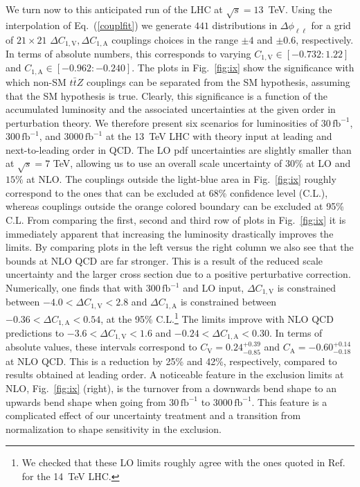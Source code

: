 \documentclass{JHEP3}
\def\ttbZ{t\bar{t}Z}
\def\invfb {\mathrm{fb}^{-1}}
\def\ConeA{C_{1,\mathrm{A}}}
\def\ConeV{C_{1,\mathrm{V}}}
\def\DConeA{\Delta C_{1,\mathrm{A}}}
\def\DConeV{\Delta C_{1,\mathrm{V}}}
\begin{document}
We turn now to this anticipated run of the LHC at $\sqrt{s}=13$~TeV.
Using the interpolation of Eq.~(\ref{couplfit}) we generate $441$ distributions in $\Delta \phi_{\ell\ell}$ for a grid of $21 \times 21$ $\DConeV,\DConeA$ couplings 
choices in the range $\pm 4$ and $\pm 0.6$, respectively. 
In terms of absolute numbers, this corresponds to varying $\ConeV \in [-0.732:1.22]$ and $\ConeA \in [-0.962:-0.240]$.
The plots in Fig.~\ref{fig:ix} show the significance with which non-SM $\ttbZ$ couplings can be separated from the SM hypothesis, assuming that the SM hypothesis is true.
Clearly, this significance is a function of the accumulated luminosity and the associated uncertainties at the given order in perturbation theory.
We therefore present six scenarios for luminosities of $30\, \invfb$, $300\, \invfb$, and $3000\, \invfb$ at the 13~TeV LHC with 
theory input at leading and next-to-leading order in QCD.
The LO pdf uncertainties are slightly smaller than at $\sqrt{s}=7$ TeV, allowing us to use an overall scale uncertainty of $30\%$ at LO and $15\%$ at NLO.
The couplings outside the light-blue area in Fig.~\ref{fig:ix} roughly correspond to the ones that can be excluded at 68\% confidence level (C.L.),
whereas couplings outside the orange colored boundary can be excluded at 95\% C.L.
From comparing the first, second and third row of plots in Fig.~\ref{fig:ix} it is immediately apparent that 
increasing the luminosity drastically improves the limits. 
By comparing plots in the left versus the right column we also see that 
the bounds at NLO QCD are far stronger.
This is a result of the reduced scale uncertainty and the larger cross section due to a positive perturbative correction.
Numerically, one finds that with $300\, \invfb$ and LO input, $\DConeV$ is constrained between $-4.0 < \DConeV < 2.8$ and $\DConeA$ is constrained between $-0.36 < \DConeA < 0.54$, 
at the 95\% C.L.\footnote{We checked that these LO limits roughly agree with the ones quoted in Ref.~\cite{Baur:2004uw} for the 14~TeV LHC.}
The limits improve with NLO QCD predictions to $-3.6 < \DConeV < 1.6$  and $-0.24 < \DConeA < 0.30$.
In terms of absolute values, these intervals correspond to $C_\mathrm{V}=0.24^{+0.39}_{-0.85}$ and $C_\mathrm{A}=-0.60^{+0.14}_{-0.18}$ at NLO QCD.
This is a reduction by 25\% and 42\%, respectively, compared to results obtained at leading order.
A noticeable feature in the exclusion limits at NLO, Fig.~\ref{fig:ix} (right), is the turnover from a 
downwards bend shape to an upwards bend shape when going from $30\,\invfb$ to $3000\,\invfb$.
This feature is a complicated effect of our uncertainty treatment and a transition from normalization to shape sensitivity in the exclusion.
\end{document}
